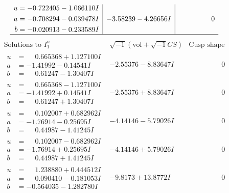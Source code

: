 \documentclass[1p]{elsarticle_modified}
\theoremstyle{definition}
\newcommand{\I}{\sqrt{-1}}
\begin{document}
$$\begin{array}{c|c|c}
\begin{aligned}
u &= -0.722405 - 1.066110 I \\
a &= -0.708294 - 0.039478 I \\
b &= -0.020913 - 0.233589 I\end{aligned}
 & -3.58239 - 4.26656 I & \phantom{-0.000000 } 0\\
 \hline 
 \end{array}$$\newpage$$\begin{array}{c|c|c}  
\text{Solutions to }I^u_{1}& \I (\text{vol} + \sqrt{-1}CS) & \text{Cusp shape}\\
 \hline 
\begin{aligned}
u &= \phantom{-}0.665368 + 1.127100 I \\
a &= -1.41992 - 0.14541 I \\
b &= \phantom{-}0.61247 - 1.30407 I\end{aligned}
 & -2.55376 - 8.83647 I & \phantom{-0.000000 } 0 \\ \hline\begin{aligned}
u &= \phantom{-}0.665368 - 1.127100 I \\
a &= -1.41992 + 0.14541 I \\
b &= \phantom{-}0.61247 + 1.30407 I\end{aligned}
 & -2.55376 + 8.83647 I & \phantom{-0.000000 } 0 \\ \hline\begin{aligned}
u &= \phantom{-}0.102007 + 0.682962 I \\
a &= -1.76914 - 0.25695 I \\
b &= \phantom{-}0.44987 - 1.41245 I\end{aligned}
 & -4.14146 - 5.79026 I & \phantom{-0.000000 } 0 \\ \hline\begin{aligned}
u &= \phantom{-}0.102007 - 0.682962 I \\
a &= -1.76914 + 0.25695 I \\
b &= \phantom{-}0.44987 + 1.41245 I\end{aligned}
 & -4.14146 + 5.79026 I & \phantom{-0.000000 } 0 \\ \hline\begin{aligned}
u &= \phantom{-}1.238880 + 0.444512 I \\
a &= \phantom{-}0.090410 - 0.181053 I \\
b &= -0.564035 - 1.282780 I\end{aligned}
 & -9.8173 + 13.8772 I & \phantom{-0.000000 } 0 \\ \hline\begin{aligned}

\end{aligned}
\end{array}$$
\end{document}
